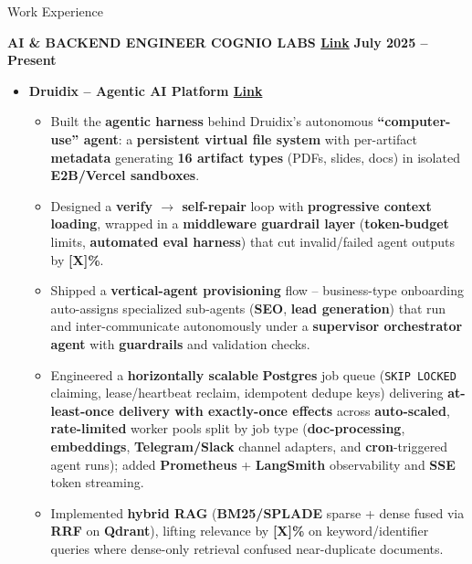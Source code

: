 \documentclass{resume}
\begin{document}
\footnotesize

\vspace{-.8em}


\vspace{-.8em}
\begin{rSection}{Work Experience}
\vspace{-1.3em}

\item \textbf{AI \& BACKEND ENGINEER \textbar\hspace{.7mm} COGNIO LABS \textbar\hspace{.7mm}\href{https://cognio.so/about}{Link}} \hfill \textbf{July 2025 --
 Present}
\begin{itemize}
    \item \textbf{Druidix -- Agentic AI Platform \textbar\hspace{.7mm}\href{https://druidx.co/}{Link}}
    \begin{itemize}
        \item Built the \textbf{agentic harness} behind Druidix's autonomous \textbf{``computer-use'' agent}: a \textbf{persistent virtual file system}
with per-artifact \textbf{metadata} generating \textbf{16 artifact types} (PDFs, slides, docs) in isolated \textbf{E2B/Vercel sandboxes}.
        \item Designed a \textbf{verify $\rightarrow$ self-repair} loop with \textbf{progressive context loading}, wrapped in a \textbf{middleware
guardrail layer} (\textbf{token-budget} limits, \textbf{automated eval harness}) that cut invalid/failed agent outputs by \textbf{[X]\%}.
        \item Shipped a \textbf{vertical-agent provisioning} flow -- business-type onboarding auto-assigns specialized sub-agents (\textbf{SEO},
\textbf{lead generation}) that run and inter-communicate autonomously under a \textbf{supervisor orchestrator agent} with \textbf{guardrails} and
validation checks.
        \item Engineered a \textbf{horizontally scalable} \textbf{Postgres} job queue (\texttt{SKIP LOCKED} claiming, lease/heartbeat reclaim,
idempotent dedupe keys) delivering \textbf{at-least-once delivery with exactly-once effects} across \textbf{auto-scaled}, \textbf{rate-limited}
worker pools split by job type (\textbf{doc-processing}, \textbf{embeddings}, \textbf{Telegram/Slack} channel adapters, and \textbf{cron}-triggered
agent runs); added \textbf{Prometheus} + \textbf{LangSmith} observability and \textbf{SSE} token streaming.
        \item Implemented \textbf{hybrid RAG} (\textbf{BM25/SPLADE} sparse + dense fused via \textbf{RRF} on \textbf{Qdrant}), lifting relevance by
\textbf{[X]\%} on keyword/identifier queries where dense-only retrieval confused near-duplicate documents.
    \end{itemize}


\end{itemize}
\end{rSection}
\end{document}

